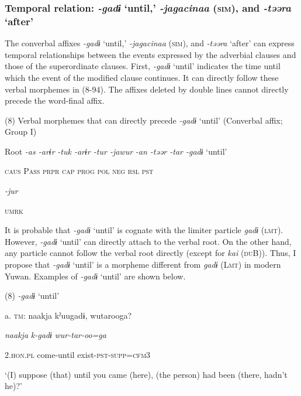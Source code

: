 \subsubsection{Temporal relation: \textit{{}-gadɨ} ‘until,’ \textit{{}-jagacinaa} (\textsc{sim}), and \textit{{}-təəra} ‘after’}

The converbal affixes \textit{{}-gadɨ} ‘until,’ \textit{{}-jagacinaa} (\textsc{sim}), and \textit{{}-təəra} ‘after’ can express temporal relationships between the events expressed by the adverbial clauses and those of the superordinate clauses. First, \textit{{}-gadɨ} ‘until’ indicates the time until which the event of the modified clause continues. It can directly follow these verbal morphemes in (8-94). The affixes deleted by double lines cannot directly precede the word-final affix.

(8)  Verbal morphemes that can directly precede \textit{{}-gadɨ} ‘until’ (Converbal affix; Group I)

  Root  \textit{{}-as  {}-arɨr} %
\textit{{}-tuk  {}-arɨr  {}-tur  {}-jawur} %
\textit{{}-an  {}-təər  {}-tar  {}-gadɨ} ‘until’

    \textsc{caus}  P\textsc{ass}  \textsc{prpr}  \textsc{cap}  \textsc{prog}  \textsc{pol}  \textsc{neg}  \textsc{rsl}  \textsc{pst}

          \textit{{}-jur} 

          \textsc{umrk}

It is probable that \textit{{}-gadɨ} ‘until’ is cognate with the limiter particle \textit{gadɨ} (\textsc{lmt}). However, \textit{{}-gadɨ} ‘until’ can directly attach to the verbal root. On the other hand, any particle cannot follow the verbal root directly (except for \textit{kai} (\textsc{du}B)). Thus, I propose that \textit{{}-gadɨ} ‘until’ is a morpheme different from \textit{gadɨ} (L\textsc{mt}) in modern Yuwan. Examples of \textit{{}-gadɨ} ‘until’ are shown below.

(8)  \textit{{}-gadɨ} ‘until’

  a.  \textsc{tm}:  naakja  kˀuugadɨ,  wutarooga?

      \textit{naakja}  \textit{k-gadɨ}  \textit{wur-tar-oo=ga}

      2.\textsc{hon}.\textsc{pl}  come-until  exist-\textsc{pst}-\textsc{supp}=\textsc{cfm}3

      ‘(I) suppose (that) until you came (here), (the person) had been (there, hadn’t he)?’

